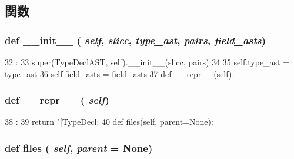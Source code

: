 \subsection{関数}
\hypertarget{classslicc_1_1ast_1_1TypeDeclAST_1_1TypeDeclAST_ac775ee34451fdfa742b318538164070e}{
\subsubsection[{\_\-\_\-init\_\-\_\-}]{\setlength{\rightskip}{0pt plus 5cm}def \_\-\_\-init\_\-\_\- ( {\em self}, \/   {\em slicc}, \/   {\em type\_\-ast}, \/   {\em pairs}, \/   {\em field\_\-asts})}}
\label{classslicc_1_1ast_1_1TypeDeclAST_1_1TypeDeclAST_ac775ee34451fdfa742b318538164070e}



\begin{DoxyCode}
32                                                           :
33         super(TypeDeclAST, self).__init__(slicc, pairs)
34 
35         self.type_ast = type_ast
36         self.field_asts = field_asts
37 
    def __repr__(self):
\end{DoxyCode}
\hypertarget{classslicc_1_1ast_1_1TypeDeclAST_1_1TypeDeclAST_ad8b9328939df072e4740cd9a63189744}{
\subsubsection[{\_\-\_\-repr\_\-\_\-}]{\setlength{\rightskip}{0pt plus 5cm}def \_\-\_\-repr\_\-\_\- ( {\em self})}}
\label{classslicc_1_1ast_1_1TypeDeclAST_1_1TypeDeclAST_ad8b9328939df072e4740cd9a63189744}



\begin{DoxyCode}
38                       :
39         return "[TypeDecl: %
40 
    def files(self, parent=None):
\end{DoxyCode}
\hypertarget{classslicc_1_1ast_1_1TypeDeclAST_1_1TypeDeclAST_a35b1a87f6fcbddeb5b793b0e415765f8}{
\subsubsection[{files}]{\setlength{\rightskip}{0pt plus 5cm}def files ( {\em self}, \/   {\em parent} = {\ttfamily None})}}
\label{classslicc_1_1ast_1_1TypeDeclAST_1_1TypeDeclAST_a35b1a87f6fcbddeb5b793b0e415765f8}



